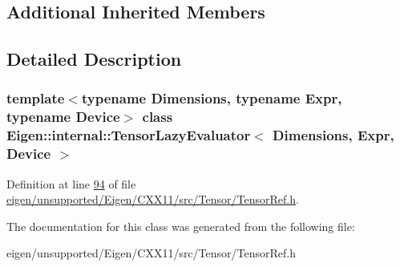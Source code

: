 \subsection*{Additional Inherited Members}


\subsection{Detailed Description}
\subsubsection*{template$<$typename Dimensions, typename Expr, typename Device$>$\newline
class Eigen\+::internal\+::\+Tensor\+Lazy\+Evaluator$<$ Dimensions, Expr, Device $>$}



Definition at line \hyperlink{eigen_2unsupported_2_eigen_2_c_x_x11_2src_2_tensor_2_tensor_ref_8h_source_l00094}{94} of file \hyperlink{eigen_2unsupported_2_eigen_2_c_x_x11_2src_2_tensor_2_tensor_ref_8h_source}{eigen/unsupported/\+Eigen/\+C\+X\+X11/src/\+Tensor/\+Tensor\+Ref.\+h}.



The documentation for this class was generated from the following file\+:\begin{DoxyCompactItemize}
\item 
eigen/unsupported/\+Eigen/\+C\+X\+X11/src/\+Tensor/\+Tensor\+Ref.\+h\end{DoxyCompactItemize}
